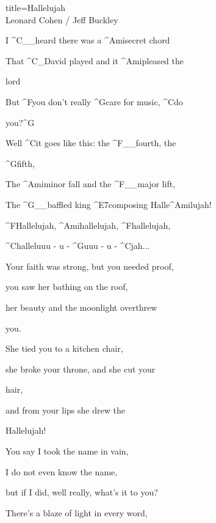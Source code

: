 \begin{song}{title=\predtitle\centering Hallelujah \\\large Leonard Cohen / Jeff Buckley \vspace*{-0.3cm}}  %
\begin{centerjustified}

\begin{varwidth}[t]{0.48\textwidth}\setlength{\parindent}{0.45cm}  %

\sloka
	I ^{C{\color{white}\_\_}}heard there was a ^{Ami}secret chord  
	
	That ^{C{\color{white}\_}}David played and it ^{Ami}pleased the 

	lord  
	
	But ^{F}you don't really ^{G}care for music, ^{C}do 

	you?^{G}  
	
	Well ^{C}it goes like this: the ^{F{\color{white}\_\_}}fourth, the 

	^{G}fifth,  
	
	The ^{Ami}minor fall and the ^{F{\color{white}\_\_}}major lift,  
	
	The ^{G{\color{white}\_\_}}baffled king ^{E7}composing Halle^{Ami}lujah!  
	

	^{F}Hallelujah, ^{Ami}hallelujah, ^{F}hallelujah,
	
	^{C}halleluuu - u - ^{G}uuu - u - ^{C}jah\elipsa.\elipsa.\elipsa.  

\sloka
	Your faith was strong, but you needed proof,  
	
	you saw her bathing on the roof,  
	
	her beauty and the moonlight overthrew 

	you.  
	
	She tied you to a kitchen chair,  
	
	she broke your throne, and she cut your 

	hair,  
	
	and from your lips she drew the 

	Hallelujah!  




\sloka
	You say I took the name in vain,  
	
	I do not even know the name,  
	
	but if I did, well really, what's it to you?  
	
	There's a blaze of light in every word,  


\end{varwidth}
\end{centerjustified}
\end{song}
